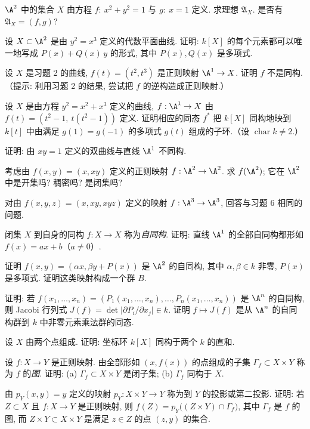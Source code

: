 \begin{compactenum}
	\item $\A^2$ 中的集合 $X$ 由方程 $f:\ x^2 + y^2 = 1$ 与 $g:\ x = 1$ 定义. 求理想 $\mathfrak A_X$. 是否有 $\mathfrak A_X = (f, g)$?
	\item 设 $X \subset \A^2$ 是由 $y^2 = x^3$ 定义的代数平面曲线. 证明: $k[X]$ 的每个元素都可以唯一地写成 $P(x) + Q(x)\, y$ 的形式, 其中 $P(x), Q(x)$ 是多项式.
	\item 设 $X$ 是习题 2 的曲线, $f(t) = (t^2, t^3)$ 是正则映射 $\A^1 \to X$. 证明 $f$ 不是同构.（提示: 利用习题 2 的结果, 尝试把 $f$ 的逆构造成正则映射.）
	\item 设 $X$ 是由方程 $y^2 = x^2 + x^3$ 定义的曲线, $f: \A^1 \to X$ 由 $f(t) = (t^2 - 1,\ t(t^2 - 1))$ 定义. 证明相应的同态 $f^*$ 把 $k[X]$ 同构地映到 $k[t]$ 中由满足 $g(1) = g(-1)$ 的多项式 $g(t)$ 组成的子环.（设 $\operatorname{char} k \ne 2$.）
	\item 证明: 由 $xy = 1$ 定义的双曲线与直线 $\A^1$ 不同构.
	\item 考虑由 $f(x, y) = (x, xy)$ 定义的正则映射 $f: \A^2 \to \A^2$. 求 $f(\A^2)$; 它在 $\A^2$ 中是开集吗? 稠密吗? 是闭集吗?
	\item 对由 $f(x, y, z) = (x, xy, xyz)$ 定义的映射 $f: \A^3 \to \A^3$, 回答与习题 6 相同的问题.
	\item 闭集 $X$ 到自身的同构 $f: X \to X$ 称为\emph{自同构}. 证明: 直线 $\A^1$ 的全部自同构都形如 $f(x) = ax + b$（$a \ne 0$）.
	\item 证明 $f(x, y) = (\alpha x, \beta y + P(x))$ 是 $\A^2$ 的自同构, 其中 $\alpha, \beta \in k$ 非零, $P(x)$ 是多项式. 证明这类映射构成一个群 $B$.
	\item 证明: 若 $f(x_1, \ldots, x_n) = (P_1(x_1, \ldots, x_n), \ldots, P_n(x_1, \ldots, x_n))$ 是 $\A^n$ 的自同构, 则 Jacobi 行列式 $J(f) = \det \bigl| \partial P_i / \partial x_j \bigr| \in k$. 证明 $f \mapsto J(f)$ 是从 $\A^n$ 的自同构群到 $k$ 中非零元素乘法群的同态.
	\item 设 $X$ 由两个点组成. 证明: 坐标环 $k[X]$ 同构于两个 $k$ 的直和.
	\item 设 $f: X \to Y$ 是正则映射. 由全部形如 $(x, f(x))$ 的点组成的子集 $\Gamma_f \subset X \times Y$ 称为 $f$ 的\emph{图}. 证明: (a) $\Gamma_f \subset X \times Y$ 是闭子集; (b) $\Gamma_f$ 同构于 $X$.
	\item 由 $p_Y(x, y) = y$ 定义的映射 $p_Y: X \times Y \to Y$ 称为到 $Y$ 的投影或第二投影. 证明: 若 $Z \subset X$ 且 $f: X \to Y$ 是正则映射, 则 $f(Z) = p_Y\bigl( (Z \times Y) \cap \Gamma_f \bigr)$, 其中 $\Gamma_f$ 是 $f$ 的图, 而 $Z \times Y \subset X \times Y$ 是满足 $z \in Z$ 的点 $(z, y)$ 的集合.

\end{compactenum}
